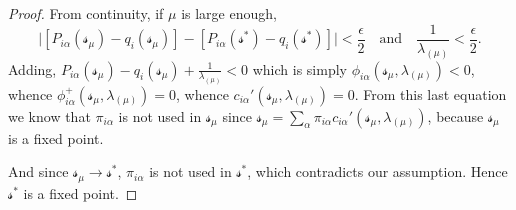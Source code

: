 \begin{proof}
    From continuity, if $\mu$ is large enough,
    \[
        \Big| \left[ P_{i\alpha }(\mathcal{s} _{\mu}) -q_i (\mathcal{s} _{\mu})\right] -\left[ P_{i\alpha }(\mathcal{s} ^*)-q_i (\mathcal{s} ^*) \right] \Big| < \frac{\epsilon}{2} \quad \text{and} \quad \frac{1}{\lambda _{(\mu)}}< \frac{\epsilon }{2}.
    \] Adding, $P_{i\alpha }(\mathcal{s} _{\mu})-q_i (\mathcal{s} _{\mu})+\frac{1}{\lambda_{(\mu)}}<0$ which is simply $\phi_{i\alpha }(\mathcal{s} _{\mu},\lambda_{(\mu)})<0$, whence $\phi_{i\alpha }^+(\mathcal{s} _{\mu},\lambda_{(\mu)})=0$, whence $c_{i\alpha }'(\mathcal{s} _{\mu},\lambda_{(\mu)})=0$. From this last equation we know that $\pi_{i\alpha }$ is not used in $\mathcal{s} _{\mu}$ since $\mathcal{s} _{\mu}=\sum_{\alpha }^{} \pi_{i\alpha }c_{i\alpha }'(\mathcal{s} _{\mu},\lambda_{(\mu)})$, because $\mathcal{s} _{\mu}$ is a fixed point.

    And since $\mathcal{s} _{\mu}\to \mathcal{s} ^*$, $\pi_{i\alpha }$ is not used in $\mathcal{s} ^*$, which contradicts our assumption. Hence $\mathcal{s} ^*$ is a fixed point.
\end{proof}

